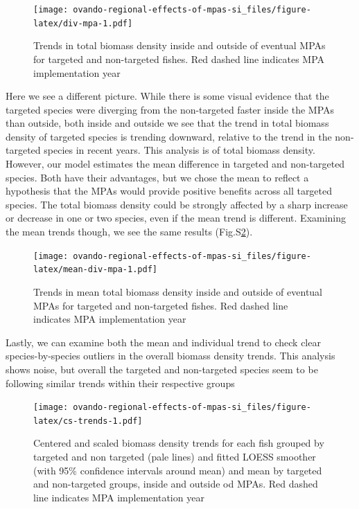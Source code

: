 \documentclass[]{article}
\begin{document}
\begin{figure}
\centering
\texttt{[image: ovando-regional-effects-of-mpas-si\_files/figure-latex/div-mpa-1.pdf]}
\caption{\label{fig:div-mpa}Trends in total biomass density inside and outside of eventual MPAs for targeted and non-targeted fishes. Red dashed line indicates MPA implementation year}
\end{figure}

Here we see a different picture. While there is some visual evidence that the targeted species were diverging from the non-targeted faster inside the MPAs than outside, both inside and outside we see that the trend in total biomass density of targeted species is trending downward, relative to the trend in the non-targeted species in recent years. This analysis is of total biomass density. However, our model estimates the mean difference in targeted and non-targeted species. Both have their advantages, but we chose the mean to reflect a hypothesis that the MPAs would provide positive benefits across all targeted species. The total biomass density could be strongly affected by a sharp increase or decrease in one or two species, even if the mean trend is different. Examining the mean trends though, we see the same results (Fig.S\ref{fig:mean-div-mpa}).

\begin{figure}
\centering
\texttt{[image: ovando-regional-effects-of-mpas-si\_files/figure-latex/mean-div-mpa-1.pdf]}
\caption{\label{fig:mean-div-mpa}Trends in mean total biomass density inside and outside of eventual MPAs for targeted and non-targeted fishes. Red dashed line indicates MPA implementation year}
\end{figure}

Lastly, we can examine both the mean and individual trend to check clear species-by-species outliers in the overall biomass density trends. This analysis shows noise, but overall the targeted and non-targeted species seem to be following similar trends within their respective groups

\begin{figure}
\centering
\texttt{[image: ovando-regional-effects-of-mpas-si\_files/figure-latex/cs-trends-1.pdf]}
\caption{\label{fig:cs-trends}Centered and scaled biomass density trends for each fish grouped by targeted and non targeted (pale lines) and fitted LOESS smoother (with 95\% confidence intervals around mean) and mean by targeted and non-targeted groups, inside and outside od MPAs. Red dashed line indicates MPA implementation year}
\end{figure}
\end{document}

